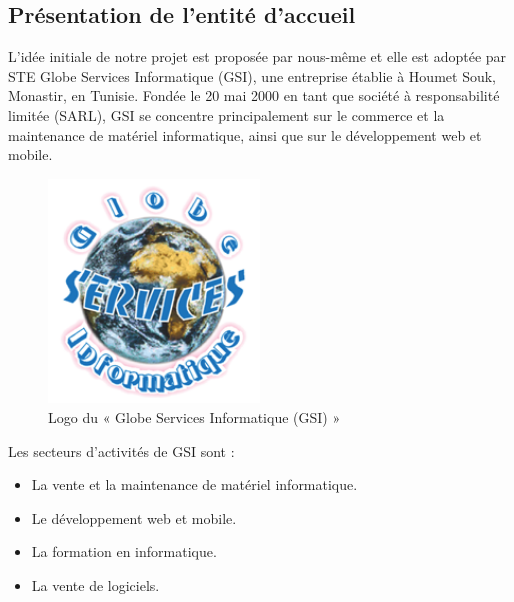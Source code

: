 \subsection{Présentation de l'entité d'accueil}
{L'idée initiale de notre projet est proposée par nous-même et elle est adoptée par STE Globe Services Informatique (GSI), une entreprise établie à Houmet Souk, Monastir, en Tunisie. Fondée le 20 mai 2000 en tant que société à responsabilité limitée (SARL), GSI se concentre principalement sur le commerce et la maintenance de matériel informatique, ainsi que sur le développement web et mobile.}
\begin{figure}[ht]
    \centering
    \includegraphics[width=0.5\textwidth]{images/gsi-logo.png}
    \caption{Logo du « Globe Services Informatique (GSI) »}
    \label{fig:gsi-logo}    
\end{figure}

Les secteurs d'activités de GSI sont :
\begin{itemize}
    \item La vente et la maintenance de matériel informatique.
    \item Le développement web et mobile.
    \item La formation en informatique.
    \item La vente de logiciels.
\end{itemize}

